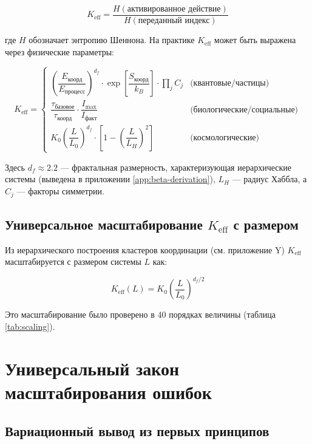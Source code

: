 \documentclass[12pt,a4paper]{article}
\theoremstyle{remark}
\newcommand{\Keff}{K_{\mathrm{eff}}}
\newcommand{\df}{d_{\!f}}
\begin{document}
	\begin{equation}
		\Keff = \frac{H(\text{активированное действие})}{H(\text{переданный индекс})}
		\label{eq:keff-def}
	\end{equation}
	
	где $H$ обозначает энтропию Шеннона. На практике $\Keff$ может быть выражена через физические параметры:
	
	\begin{equation}
		\Keff = 
		\begin{cases}
			\left(\dfrac{E_{\text{коорд}}}{E_{\text{процесс}}}\right)^{\df} \cdot \exp\left[\dfrac{S_{\text{коорд}}}{k_B}\right] \cdot \prod_j C_j & \text{(квантовые/частицы)} \\[1em]
			\dfrac{\tau_{\text{базовое}}}{\tau_{\text{коорд}}} \cdot \dfrac{I_{\text{max}}}{I_{\text{факт}}} & \text{(биологические/социальные)} \\[1em]
			K_0 \left(\dfrac{L}{L_0}\right)^{\df} \cdot \left[1 - \left(\dfrac{L}{L_H}\right)^2\right] & \text{(космологические)}
		\end{cases}
		\label{eq:keff-cases}
	\end{equation}
	
	Здесь $\df \approx 2.2$ — фрактальная размерность, характеризующая иерархические системы (выведена в приложении \ref{app:beta-derivation}), $L_H$ — радиус Хаббла, а $C_j$ — факторы симметрии.
	
	\subsection{Универсальное масштабирование $\Keff$ с размером}
	
	Из иерархического построения кластеров координации (см. приложение Y) $\Keff$ масштабируется с размером системы $L$ как:
	
	\begin{equation}
		\Keff(L) = K_0 \left(\frac{L}{L_0}\right)^{\df/2}
		\label{eq:keff-scaling}
	\end{equation}
	
	Это масштабирование было проверено в 40 порядках величины (таблица \ref{tab:scaling}).
	
	\section{Универсальный закон масштабирования ошибок}
	\label{sec:error-law}
	
	\subsection{Вариационный вывод из первых принципов}
	
\end{document}
